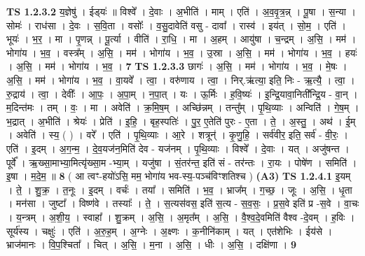 \documentclass[17pt]{extarticle}
\begin{document}
                                \textbf{ TS 1.2.3.2} \newline
                  य॒ज्ञेषु॑ । ईड्‍यः॑ ॥ विश्वे᳚ । दे॒वाः । अ॒भीति॑ । माम् । एति॑ । अ॒व॒वृ॒त्र॒न्न् । पू॒षा । स॒न्या । सोमः॑ । राध॑सा । दे॒वः । स॒वि॒ता । वसोः᳚ । व॒सु॒दावेति॑ वसु - दावा᳚ । रास्व॑ । इय॑त् । सो॒म॒ । एति॑ । भूयः॑ । भ॒र॒ । मा । पृ॒णन्न् । पू॒र्त्या । वीति॑ । रा॒धि॒ । मा । अ॒हम् । आयु॑षा । च॒न्द्रम् । अ॒सि॒ । मम॑ । भोगा॑य । भ॒व॒ । वस्त्र᳚म् । अ॒सि॒ । मम॑ । भोगा॑य । भ॒व॒ । उ॒स्रा । अ॒सि॒ । मम॑ । भोगा॑य । भ॒व॒ । हयः॑ । अ॒सि॒ । मम॑ । भोगा॑य । भ॒व॒ । \textbf{  7} \newline
                  \newline
                                \textbf{ TS 1.2.3.3} \newline
                  छागः॑ । अ॒सि॒ । मम॑ । भोगा॑य । भ॒व॒ । मे॒षः । अ॒सि॒ । मम॑ । भोगा॑य । भ॒व॒ । वा॒यवे᳚ । त्वा॒ । वरु॑णाय । त्वा॒ । निर्.ऋ॑त्या॒ इति॒ निः - ऋ॒त्यै॒ । त्वा॒ । रु॒द्राय॑ । त्वा॒ । देवीः᳚ । आ॒पः॒ । अ॒पा॒म् । न॒पा॒त् । यः । ऊ॒र्मिः । ह॒वि॒ष्यः॑ । इ॒न्द्रि॒यावा॒निती᳚न्द्रि॒य - वा॒न् । म॒दिन्त॑मः । तम् । वः॒ । मा । अवेति॑ । क्र॒मि॒ष॒म् । अच्छि॑न्नम् । तन्तु᳚म् । पृ॒थि॒व्याः । अन्विति॑ । गे॒ष॒म् । भ॒द्रात् । अ॒भीति॑ । श्रेयः॑ । प्रेति॑ । इ॒हि॒ । बृह॒स्पतिः॑ । पु॒र॒ ए॒तेति॑ पुरः - ए॒ता । ते॒ । अ॒स्तु॒ । अथ॑ । ई॒म् । अवेति॑ । स्य॒ ( ) । वरे᳚ । एति॑ । पृ॒थि॒व्याः । आ॒रे । शत्रून्॑ । कृ॒णु॒हि॒ । सर्व॑वीर॒ इति॒ सर्व॑ - वी॒रः॒ । एति॑ । इ॒दम् । अ॒ग॒न्म॒ । दे॒व॒यज॑न॒मिति॑ देव - यज॑नम् । पृ॒थि॒व्याः । विश्वे᳚ । दे॒वाः । यत् । अजु॑षन्त । पूर्वे᳚ । ऋ॒ख्सा॒माभ्या॒मित्यृ॑ख्सा॒म -भ्या॒म् । यजु॑षा । सं॒तर॑न्त॒ इति॑ सं - तर॑न्तः । रा॒यः । पोषे॑ण । समिति॑ । इ॒षा । म॒दे॒म॒ ॥ \textbf{  8} \newline
                  \newline
                      ( आ त्वꣳ-हयो॑ऽसि॒ मम॒ भोगा॑य भव-स्य॒-पञ्च॑विꣳशतिश्च )  \textbf{(A3)} \newline \newline
                                \textbf{ TS 1.2.4.1} \newline
                  इ॒यम् । ते॒ । शु॒क्र॒ । त॒नूः । इ॒दम् । वर्चः॑ । तया᳚ । समिति॑ । भ॒व॒ । भ्राज᳚म् । ग॒च्छ॒ । जूः । अ॒सि॒ । धृ॒ता । मन॑सा । जुष्टा᳚ । विष्ण॑वे । तस्याः᳚ । ते॒ । स॒त्यस॑वस॒ इति॑ स॒त्य - स॒व॒सः॒ । प्र॒स॒वे इति॑ प्र -स॒वे । वा॒चः । य॒न्त्रम् । अ॒शी॒य॒ । स्वाहा᳚ । शु॒क्रम् । अ॒सि॒ । अ॒मृत᳚म् । अ॒सि॒ । वै॒श्व॒दे॒वमिति॑ वैश्व -दे॒वम् । ह॒विः । सूर्य॑स्य । चक्षुः॑ । एति॑ । अ॒रु॒ह॒म् । अ॒ग्नेः । अ॒क्ष्णः । क॒नीनि॑काम् । यत् । एत॑शेभिः । ईय॑से । भ्राज॑मानः । वि॒प॒श्चिता᳚ । चित् । अ॒सि॒ । म॒ना । अ॒सि॒ । धीः । अ॒सि॒ । दक्षि॑णा । \textbf{  9} \newline
\end{document}
